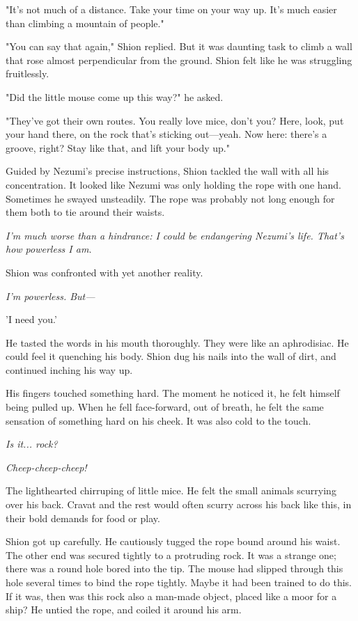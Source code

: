 "It's not much of a distance. Take your time on your way up. It's much
easier than climbing a mountain of people."

"You can say that again," Shion replied. But it was daunting task to
climb a wall that rose almost perpendicular from the ground. Shion felt
like he was struggling fruitlessly.

"Did the little mouse come up this way?" he asked.

"They've got their own routes. You really love mice, don't you? Here,
look, put your hand there, on the rock that's sticking out---yeah. Now
here: there's a groove, right? Stay like that, and lift your body up."

Guided by Nezumi's precise instructions, Shion tackled the wall with all
his concentration. It looked like Nezumi was only holding the rope with
one hand. Sometimes he swayed unsteadily. The rope was probably not long
enough for them both to tie around their waists.

\emph{I'm much worse than a hindrance: I could be endangering Nezumi's life.
That's how powerless I am.}

Shion was confronted with yet another reality.

\emph{I'm powerless. But---}

'I need you.'

He tasted the words in his mouth thoroughly. They were like an
aphrodisiac. He could feel it quenching his body. Shion dug his nails
into the wall of dirt, and continued inching his way up.

\myspace

His fingers touched something hard. The moment he noticed it, he felt
himself being pulled up. When he fell face-forward, out of breath, he
felt the same sensation of something hard on his cheek. It was also cold
to the touch.

\emph{Is it... rock?}

\emph{Cheep-cheep-cheep!}

The lighthearted chirruping of little mice. He felt the small animals
scurrying over his back. Cravat and the rest would often scurry across
his back like this, in their bold demands for food or play.

Shion got up carefully. He cautiously tugged the rope bound around his
waist. The other end was secured tightly to a protruding rock. It was a
strange one; there was a round hole bored into the tip. The mouse had
slipped through this hole several times to bind the rope tightly. Maybe
it had been trained to do this. If it was, then was this rock also a
man-made object, placed like a moor for a ship? He untied the rope, and
coiled it around his arm.

